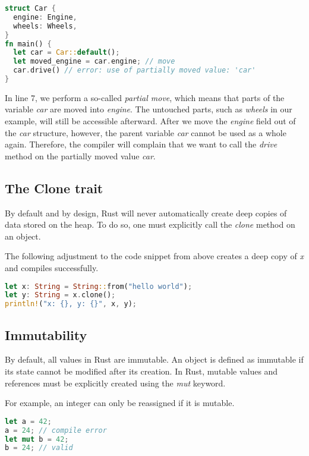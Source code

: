 \documentclass[sigplan,11pt,nonacm]{acmart}
\begin{document}
\begin{lstlisting}[language=Rust,captionpos=b,caption={Rust moving struct fields}]
struct Car {
  engine: Engine,
  wheels: Wheels,
}
fn main() {
  let car = Car::default();
  let moved_engine = car.engine; // move
  car.drive() // error: use of partially moved value: 'car'
}
\end{lstlisting}

In line 7, we perform a so-called \emph{partial move}, which means that parts of the variable \emph{car} are moved into \emph{engine}.
The untouched parts, such as \emph{wheels} in our example, will still be accessible afterward.
After we move the \emph{engine} field out of the \emph{car} structure, however, the parent variable \emph{car} cannot be used as a whole again.
Therefore, the compiler will complain that we want to call the \emph{drive} method on the partially moved value \emph{car}.


\subsection{The Clone trait}
\label{sec:rust-clone-trait}

By default and by design, Rust will never automatically create deep copies of data stored on the heap.
To do so, one must explicitly call the \emph{clone} method on an object.

The following adjustment to the code snippet from above creates a deep copy of \emph{x} and compiles successfully.
\begin{lstlisting}[language=Rust,captionpos=b,caption={Rust copy with clone}]
let x: String = String::from("hello world");
let y: String = x.clone();
println!("x: {}, y: {}", x, y);
\end{lstlisting}


\subsection{Immutability}
\label{sec:rust-immutability}

By default, all values in Rust are immutable.
An object is defined as immutable if its state cannot be modified after its creation.
In Rust, mutable values and references must be explicitly created using the \emph{mut} keyword.

For example, an integer can only be reassigned if it is mutable.
\begin{lstlisting}[language=Rust,captionpos=b,caption={Rust mutable variables}]
let a = 42;
a = 24; // compile error
let mut b = 42;
b = 24; // valid
\end{lstlisting}
\end{document}
